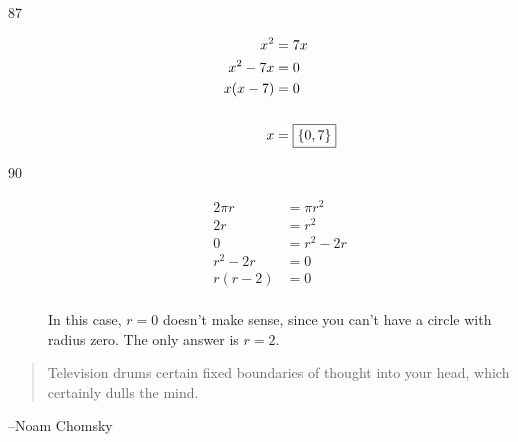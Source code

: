 \documentclass[letterpaper]{exam}
\begin{document}
\begin{description}
      \item[87]
        \begin{align*}
          x^2      & = 7x \\
          x^2 - 7x & = 0 \\
          x(x - 7) & = 0 \\
          \\
          x        & = \boxed{ \cbr{ 0, 7 } } \\
        \end{align*}

      \item[90]
        \begin{align*}
          2 \pi r  & = \pi r^2 \\
          2r       & = r^2 \\
          0        & = r^2 - 2r \\
          r^2 - 2r & = 0 \\
          r(r - 2) & = 0 \\
        \end{align*}

      In this case, $r = 0$ doesn't make sense, since you can't have a circle with radius zero.  The
      only answer is $\boxed{ r = 2 }$.



    \end{description}
  \fi
  \ifprintanswers{}
  \else
    \vspace{7 cm}
    \begin{quote}
      \begin{em}
        Television drums certain fixed boundaries of thought into your head, which certainly dulls the mind. 
      \end{em}
    \end{quote}
    \hspace{2 cm}--Noam Chomsky
  \fi
\end{document}
